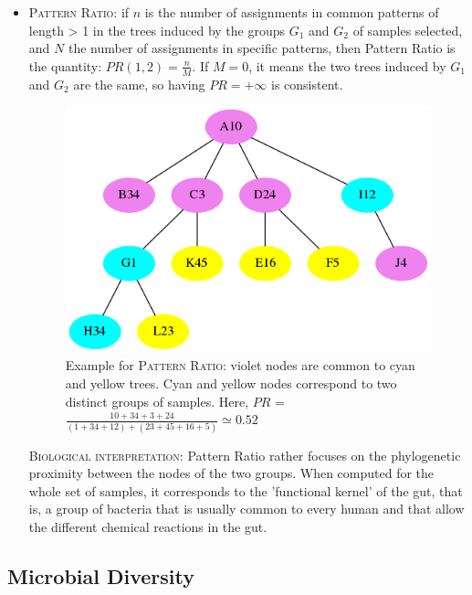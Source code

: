 \documentclass{report}
\begin{document}
\begin{itemize} 
\item \textsc{Pattern Ratio:} if $n$ is the number of assignments in common patterns of length > 1 in the trees induced by the groups $G_{1}$ and $G_{2}$ of samples selected, and $N$ the number of assignments in specific patterns, then Pattern Ratio is the quantity: $PR(1,2) = \frac{n}{M}$. If $M = 0$, it means the two trees induced by $G_{1}$ and $G_{2}$ are the same, so having $PR = +\infty$ is consistent.

\begin{figure}[H]
\centering
\includegraphics[scale=0.5]{illustrations/patternratio.png}
\caption{Example for \textsc{Pattern Ratio}: violet nodes are common to cyan and yellow trees. Cyan and yellow nodes correspond to two distinct groups of samples. Here, $PR$ = $\frac{10 + 34 + 3 + 24}{(1 + 34 + 12) + (23 + 45 + 16 + 5)} \simeq 0.52$}
\end{figure}

\bigskip

  \textsc{Biological interpretation:} Pattern Ratio rather focuses on the phylogenetic proximity between the nodes of the two groups. When computed for the whole set of samples, it corresponds to the 'functional kernel' of the gut, that is, a group of bacteria that is usually common to every human and that allow the different chemical reactions in the gut. 

\end{itemize}

\subsection{Microbial Diversity}
\end{document}
